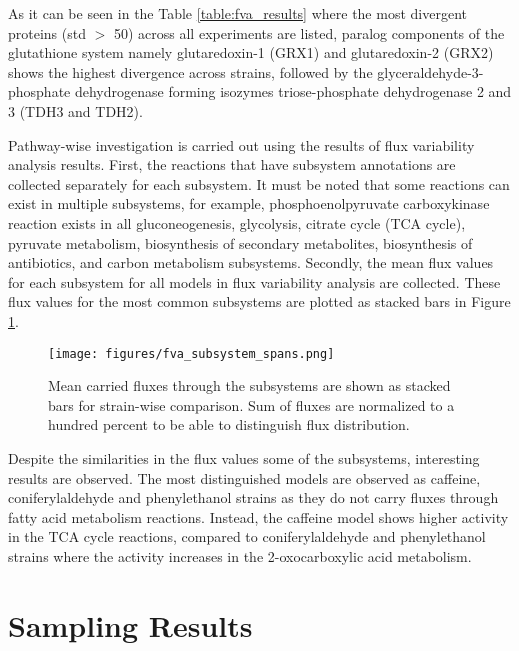 As it can be seen in the Table \ref{table:fva_results} where the most divergent proteins (std $>$ 50) across all experiments are listed, paralog components of the glutathione system namely glutaredoxin-1 (GRX1) and glutaredoxin-2 (GRX2) shows the highest divergence across strains, followed by the glyceraldehyde-3-phosphate dehydrogenase forming isozymes triose-phosphate dehydrogenase 2 and 3 (TDH3 and TDH2).



Pathway-wise investigation is carried out using the results of flux variability analysis results. First, the reactions that have subsystem annotations are collected separately for each subsystem. It must be noted that some reactions can exist in multiple subsystems, for example, phosphoenolpyruvate carboxykinase reaction exists in all gluconeogenesis, glycolysis, citrate cycle (TCA cycle), pyruvate metabolism, biosynthesis of secondary metabolites, biosynthesis of antibiotics, and carbon metabolism subsystems. Secondly, the mean flux values for each subsystem for all models in flux variability analysis are collected. These flux values for the most common subsystems are plotted as stacked bars in Figure \ref{fig:fva_subsystem_spans}.

\begin{figure}[H]
  \begin{center}
  \texttt{[image: figures/fva\_subsystem\_spans.png]}
  \caption[Mean carried fluxes through the subsystems are shown as stacked bars for strain-wise comparison. Sum of fluxes are normalized to a hundred percent to be able to distinguish flux distribution]{Mean carried fluxes through the subsystems are shown as stacked bars for strain-wise comparison. Sum of fluxes are normalized to a hundred percent to be able to distinguish flux distribution.}
  \label{fig:fva_subsystem_spans}
  \end{center}
\end{figure}

Despite the similarities in the flux values some of the subsystems, interesting results are observed. The most distinguished models are observed as caffeine, coniferylaldehyde and phenylethanol strains as they do not carry fluxes through fatty acid metabolism reactions. Instead, the caffeine model shows higher activity in the TCA cycle reactions, compared to coniferylaldehyde and phenylethanol strains where the activity increases in the 2-oxocarboxylic acid metabolism.

\section{Sampling Results}


